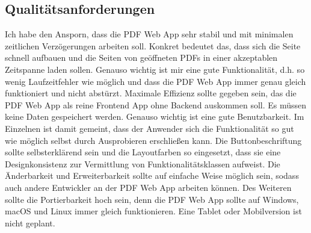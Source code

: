 \subsection{Qualitätsanforderungen}
Ich habe den Ansporn, dass die PDF Web App sehr stabil und mit minimalen zeitlichen Verzögerungen arbeiten soll. Konkret bedeutet das, dass sich die Seite schnell aufbauen und die Seiten von geöffneten PDFs in einer akzeptablen Zeitspanne laden sollen. Genauso wichtig ist mir eine gute Funktionalität, d.h. so wenig Laufzeitfehler wie möglich und dass die PDF Web App immer genau gleich funktioniert und nicht abstürzt. Maximale Effizienz sollte gegeben sein, das die PDF Web App als reine Frontend App ohne Backend auskommen soll. Es müssen keine Daten gespeichert werden. Genauso wichtig ist eine gute Benutzbarkeit. Im Einzelnen ist damit gemeint, dass der Anwender sich die Funktionalität so gut wie möglich selbst durch Ausprobieren erschließen kann. Die Buttonbeschriftung sollte selbsterklärend sein und die Layoutfarben so eingesetzt, dass sie eine Designkonsistenz zur Vermittlung von Funktionalitätsklassen aufweist. Die Änderbarkeit und Erweiterbarkeit sollte auf einfache Weise möglich sein, sodass auch andere Entwickler an der PDF Web App arbeiten können. Des Weiteren sollte die Portierbarkeit hoch sein, denn die PDF Web App sollte auf Windows, macOS und Linux immer gleich funktionieren. Eine Tablet oder Mobilversion ist nicht geplant.
